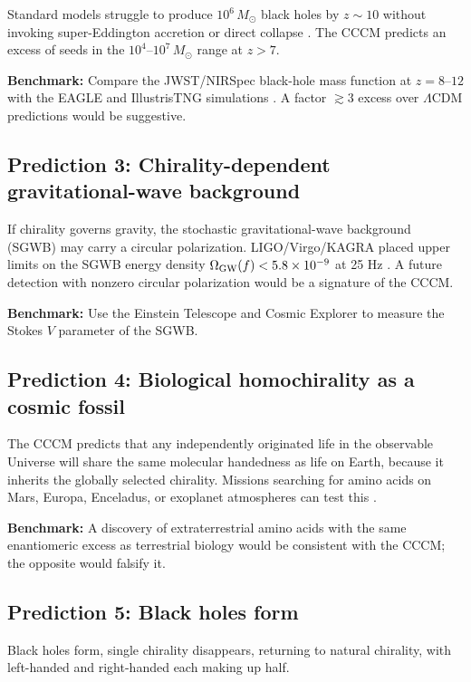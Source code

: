 \documentclass[a4paper,11pt]{article}
\newcommand{\LCDM}{$\Lambda$CDM}
\newcommand{\CCCM}{CCCM}
\begin{document}
Standard models struggle to produce $10^6\,M_\odot$ black holes by $z \sim 10$ without invoking super-Eddington accretion or direct collapse \citep{Inayoshi2020}. The \CCCM{} predicts an excess of seeds in the $10^4$--$10^7\,M_\odot$ range at $z > 7$.

\textbf{Benchmark:} Compare the JWST/NIRSpec black-hole mass function at $z=8$--$12$ with the EAGLE and IllustrisTNG simulations \citep{Schaye2015,Pillepich2018}. A factor $\gtrsim 3$ excess over \LCDM{} predictions would be suggestive.

\subsection{Prediction 3: Chirality-dependent gravitational-wave background}

If chirality governs gravity, the stochastic gravitational-wave background (SGWB) may carry a circular polarization. LIGO/Virgo/KAGRA placed upper limits on the SGWB energy density $\Omega_{\rm GW}(f) < 5.8\times 10^{-9}$ at 25 Hz \citep{Abbott2023}. A future detection with nonzero circular polarization would be a signature of the \CCCM.

\textbf{Benchmark:} Use the Einstein Telescope and Cosmic Explorer to measure the Stokes $V$ parameter of the SGWB.

\subsection{Prediction 4: Biological homochirality as a cosmic fossil}

The \CCCM{} predicts that any independently originated life in the observable Universe will share the same molecular handedness as life on Earth, because it inherits the globally selected chirality. Missions searching for amino acids on Mars, Europa, Enceladus, or exoplanet atmospheres can test this \citep{Bos2021}.

\textbf{Benchmark:} A discovery of extraterrestrial amino acids with the same enantiomeric excess as terrestrial biology would be consistent with the \CCCM; the opposite would falsify it.


\subsection{Prediction 5: Black holes form}

Black holes form, single chirality disappears, returning to natural chirality, with left-handed and right-handed each making up half.
\end{document}
